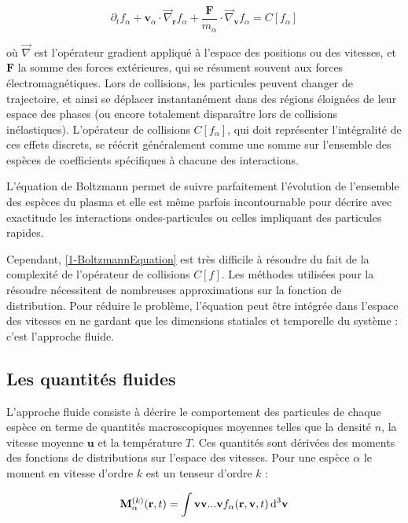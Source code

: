 \begin{refsection}
\begin{equation}
\label{1-BoltzmannEquation}
\partial_tf_\alpha+\mathbf{v}_\alpha\cdot\vec\nabla_\mathbf{r}f_\alpha+
\frac{\mathbf{F}}{m_\alpha}\cdot\vec\nabla_{\mathbf{v}}f_\alpha
=C[f_\alpha]
\end{equation}

où $\vec\nabla$ est l'opérateur gradient appliqué à l'espace des positions ou
des vitesses, et $\mathbf{F}$ la somme des forces extérieures, qui se résument
souvent aux forces électromagnétiques. Lors de collisions, les particules peuvent changer de
trajectoire, et ainsi se déplacer instantanément dans des régions éloignées de leur espace des
phases (ou encore totalement disparaître lors de collisions inélastiques).
L'opérateur de collisions $C[f_\alpha]$, qui doit représenter l'intégralité de
ces effets discrets, se réécrit généralement comme une somme sur l'ensemble des
espèces de coefficients spécifiques à chacune des interactions.

L'équation de Boltzmann permet de suivre
parfaitement l'évolution de l'ensemble des espèces du plasma et elle est
même parfois incontournable pour décrire avec exactitude les interactions
ondes-particules ou celles impliquant des particules rapides. 

Cependant, \eqref{1-BoltzmannEquation} est très
difficile à résoudre du fait de la complexité de l'opérateur de collisions
$C[f]$. Les méthodes utilisées pour la résoudre nécessitent de nombreuses
approximations sur la fonction de distribution\parencite{HagelaarHDR}. Pour
réduire le problème, l'équation peut être intégrée dans l'espace des vitesses
en ne gardant que les dimensions statiales et temporelle du système : c'est
l'approche fluide.

\subsection{Les quantités fluides}
L'approche fluide consiste à décrire le comportement des particules de chaque
espèce en terme de quantités macroscopiques moyennes telles que la densité $n$,
la vitesse moyenne $\mathbf u$ et la température $T$. Ces quantités sont dérivées
des moments des fonctions de distributions sur l'espace des vitesses.
Pour une espèce $\alpha$ le moment en vitesse d'ordre $k$ est un tenseur d'ordre
$k$ :

\begin{equation}
\mathbf M^{(k)}_\alpha(\mathbf
r,t)=\int\mathbf{v} \mathbf{v} . . .
\mathbf{v} f_\alpha(\mathbf r,\mathbf v,t)
\,\text{d}^{{3}}\mathbf{v}
\end{equation}


\end{refsection}
